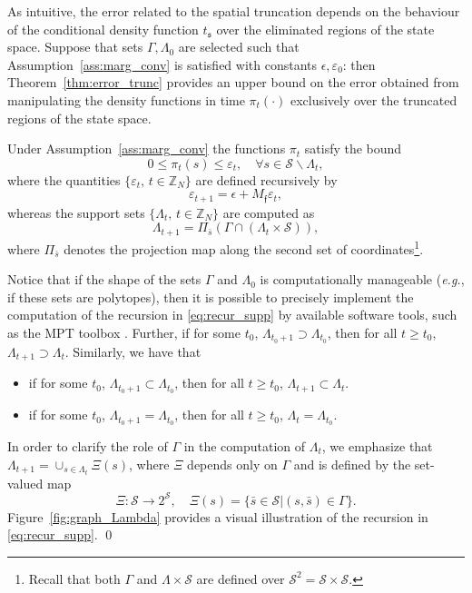 \documentclass{LMCS}
\def\eg{{\em e.g.}\xspace}
\begin{document}
As intuitive, the error related to the spatial truncation depends on the behaviour of the conditional density function $t_{\mathfrak s}$ over the eliminated regions of the state space. 
Suppose that sets $\varGamma,\Lambda_0$ are selected such that Assumption~\ref{ass:marg_conv} is satisfied with constants $\epsilon,\varepsilon_0$:  
then Theorem~\ref{thm:error_trunc} provides an upper bound on the error obtained from manipulating the density functions in time $\pi_t(\cdot)$ exclusively over the truncated regions of the state space. 
\begin{thm}
\label{thm:bound_behaviour}
Under Assumption~\ref{ass:marg_conv}
the functions $\pi_t$ satisfy the bound
\begin{equation*}
0\le \pi_t(s)\le \varepsilon_t, \quad \forall s\in\mathcal S\backslash\Lambda_t,
\end{equation*}
where the quantities $\{\varepsilon_t,\,t\in\mathbb Z_N\}$ are defined recursively by
\begin{equation}
\label{eq:trunc_error}
\varepsilon_{t+1} = \epsilon+M_{\mathfrak f}\varepsilon_t, 
\end{equation}
whereas the support sets $\{\Lambda_t,\,t\in\mathbb Z_N\}$ are computed as 
\begin{equation}
\label{eq:recur_supp}
\Lambda_{t+1} = \Pi_{\bar s}\left(\varGamma\cap(\Lambda_t\times\mathcal S)\right),
\end{equation}
where $\Pi_{\bar s}$ denotes the projection map along the second set of coordinates\footnote{Recall that both $\varGamma$ and $\Lambda\times \mathcal S$ are defined over $\mathcal S^2 = \mathcal S\times\mathcal S$.}.
\end{thm}

\begin{rem}
Notice that if the shape of the sets $\varGamma$ and $\Lambda_0$ is computationally manageable (\eg, if these sets are polytopes),  
then it is possible to precisely implement the computation of the recursion in \eqref{eq:recur_supp} by available software tools, 
such as the MPT toolbox \cite{mpt}. 
Further, 
if for some $t_0$, $\Lambda_{t_0+1}\supset\Lambda_{t_0}$, then for all $t\ge t_0$, $\Lambda_{t+1}\supset\Lambda_t$. 
Similarly, we have that 
\begin{itemize}
\item if for some $t_0$, $\Lambda_{t_0+1}\subset\Lambda_{t_0}$, then for all $t\ge t_0$, $\Lambda_{t+1}\subset\Lambda_t$.
\item if for some $t_0$, $\Lambda_{t_0+1} = \Lambda_{t_0}$, then for all $t\ge t_0$, $\Lambda_{t}=\Lambda_{t_0}$. 
\end{itemize}  
In order to clarify the role of $\varGamma$ in the computation of $\Lambda_t$, 
we emphasize that $\Lambda_{t+1} = \cup_{s\in\Lambda_t}\varXi(s)$, 
where $\varXi$ depends only on $\varGamma$ and is defined by the set-valued map
\begin{equation*}
\varXi:\mathcal S\rightarrow 2^{\mathcal S},\quad \varXi(s) = \{\bar s\in\mathcal S| (s,\bar s)\in\varGamma\}.
\end{equation*}
Figure~\ref{fig:graph_Lambda} provides a visual illustration of the recursion in \eqref{eq:recur_supp}. \qed
\end{rem}
\end{document}
